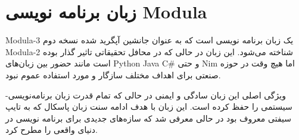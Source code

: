 \documentclass[20pt, a4paper]{article}
\begin{document}
\section{زبان برنامه نویسی Modula}

Modula-3 یک زبان برنامه نویسی است که به عنوان جانشین آپگرید شده نسخه دوم
Modula-2 شناخته می‌شود. این زبان در حالی که در محافل تحقیقاتی تاثیر گذار بوده
است مانند حضور بین زبان‌های Python Java C\# و حتی Nim اما هیچ وقت در حوزه صنعتی
برای اهداف مختلف سازگار و مورد استفاده عموم نبود.

ویژگی اصلی این زبان سادگی و ایمنی در حالی که تمام قدرت زبان برنامه‌نویسی-سیستمی
را حفظ کرده است. این زبان با هدف ادامه سنت زبان پاسکال که به تایپ سیفتی معروف
بود در حالی معرفی شد که سازه‌های جدیدی برای برنامه نویسی در دنیای واقعی را مطرح
کرد.
\end{document}
